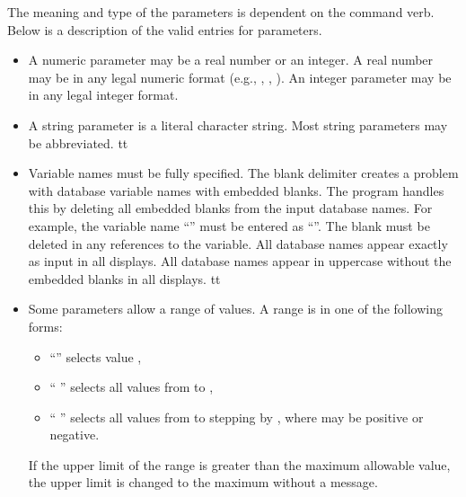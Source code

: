 The meaning and type of the parameters is dependent on the command verb.
Below is a description of the valid entries for parameters.
\setlength{\itemsep}{\medskipamount} \begin{itemize}
%
\item
A numeric parameter may be a real number or an integer. A real number
may be in any legal  numeric format (e.g., ,
, ). An integer parameter may be in any legal
integer format.
\item
A string parameter is a literal character string. Most string parameters
may be abbreviated.
%
\newcommand{\okname}{f}
\ifx\PROGRAM\BLOT \renewcommand{\okname}{t} \fi
\ifx\PROGRAM\ALGEBRA \renewcommand{\okname}{t} \fi
\ifx\PROGRAM\EXPLORE \renewcommand{\okname}{t} \fi
\if\okname t
\item
Variable names must be fully specified. The blank delimiter creates a
problem with database variable names with embedded blanks. The program
handles this by deleting all embedded blanks from the input database
names. For example, the variable name ``'' must be entered as
``''. The blank must be deleted in any references to the
variable.
\ifx\PROGRAM\EXPLORE
All database names appear exactly as input in all displays.
\else
All database names appear in uppercase without the embedded blanks in
all displays.
\fi
\fi
\newcommand{\okrange}{f}
\ifx\PROGRAM\BLOT \renewcommand{\okrange}{t} \fi
\ifx\PROGRAM\EXPLORE \renewcommand{\okrange}{t} \fi
\ifx\PROGRAM\NUMBERS \renewcommand{\okrange}{t} \fi
\if\okrange t
\item
Some parameters allow a range of values. A range is in one of the
following forms:
\setlength{\itemsep}{\medskipamount} \begin{itemize}
\item ``'' selects value ,
\item ``  '' selects all values from
 to ,
\item ``    ''
selects all values from  to  stepping by
, where  may be positive or negative.
\end{itemize}
If the upper limit of the range is greater than the maximum allowable
value, the upper limit is changed to the maximum without a message.
\fi
\end{itemize}

